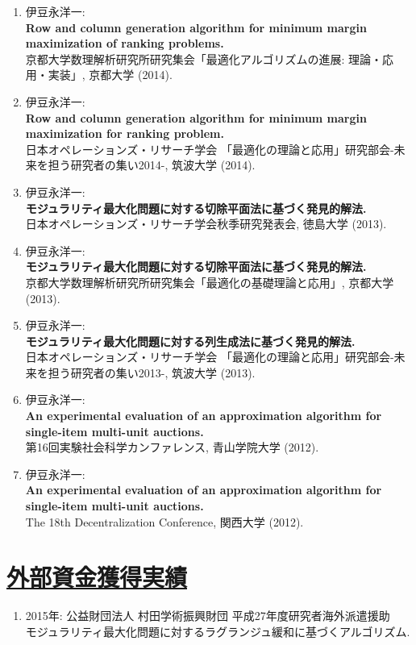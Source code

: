 \documentclass[dvipdfmx,9pt,a4paper]{article}
\begin{document}
\begin{enumerate}
\item 伊豆永洋一:\\
{\bf Row and column generation algorithm for minimum margin maximization of ranking problems.}\\
{京都大学数理解析研究所研究集会「最適化アルゴリズムの進展: 理論・応用・実装」}, 京都大学 (2014).

\item 伊豆永洋一:\\
{\bf Row and column generation algorithm for minimum margin maximization for ranking problem.}\\
{日本オペレーションズ・リサーチ学会 「最適化の理論と応用」研究部会-未来を担う研究者の集い2014-}, 筑波大学 (2014).

\item 伊豆永洋一:\\
{\bf モジュラリティ最大化問題に対する切除平面法に基づく発見的解法.}\\
{日本オペレーションズ・リサーチ学会秋季研究発表会}, 徳島大学 (2013).

\item 伊豆永洋一:\\
{\bf モジュラリティ最大化問題に対する切除平面法に基づく発見的解法.}\\
{京都大学数理解析研究所研究集会「最適化の基礎理論と応用」}, 京都大学 (2013).

\item 伊豆永洋一:\\
{\bf モジュラリティ最大化問題に対する列生成法に基づく発見的解法.}\\
{日本オペレーションズ・リサーチ学会 「最適化の理論と応用」研究部会-未来を担う研究者の集い2013-}, 筑波大学 (2013).

\item 伊豆永洋一:\\
{\bf An experimental evaluation of an approximation algorithm for single-item multi-unit auctions.}\\
{第16回実験社会科学カンファレンス}, 青山学院大学 (2012).

\item 伊豆永洋一:\\
{\bf An experimental evaluation of an approximation algorithm for single-item multi-unit auctions.}\\
{The 18th Decentralization Conference}, 関西大学 (2012).

\end{enumerate}


\section*{\underline{外部資金獲得実績}}

\begin{enumerate}
\item 2015年: 公益財団法人 村田学術振興財団 平成27年度研究者海外派遣援助\\
{モジュラリティ最大化問題に対するラグランジュ緩和に基づくアルゴリズム.}
\end{enumerate}
\end{document}
